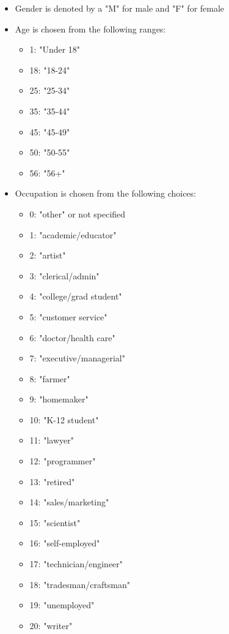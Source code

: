 \documentclass[11pt]{article}
\providecommand{\tightlist}{%
      \setlength{\itemsep}{0pt}\setlength{\parskip}{0pt}}
\begin{document}
\begin{itemize}
\item
  Gender is denoted by a "M" for male and "F" for female
\item
  Age is chosen from the following ranges:

  \begin{itemize}
  \tightlist
  \item
    1: "Under 18"
  \item
    18: "18-24"
  \item
    25: "25-34"
  \item
    35: "35-44"
  \item
    45: "45-49"
  \item
    50: "50-55"
  \item
    56: "56+"
  \end{itemize}
\item
  Occupation is chosen from the following choices:

  \begin{itemize}
  \tightlist
  \item
    0: "other" or not specified
  \item
    1: "academic/educator"
  \item
    2: "artist"
  \item
    3: "clerical/admin"
  \item
    4: "college/grad student"
  \item
    5: "customer service"
  \item
    6: "doctor/health care"
  \item
    7: "executive/managerial"
  \item
    8: "farmer"
  \item
    9: "homemaker"
  \item
    10: "K-12 student"
  \item
    11: "lawyer"
  \item
    12: "programmer"
  \item
    13: "retired"
  \item
    14: "sales/marketing"
  \item
    15: "scientist"
  \item
    16: "self-employed"
  \item
    17: "technician/engineer"
  \item
    18: "tradesman/craftsman"
  \item
    19: "unemployed"
  \item
    20: "writer"
  \end{itemize}
\end{itemize}
\end{document}
